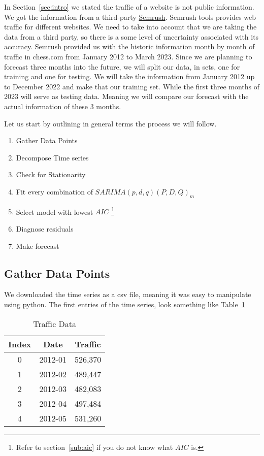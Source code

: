 \documentclass[journal]{IEEEtran}
\begin{document}
In Section~\ref{sec:intro} we stated the traffic of a website is not public
information. We got the information from a third-party
\href{http://semrush.com}{Semrush}. Semrush tools provides web traffic for
different websites. We need to take into account that we are taking the data
from a third party, so there is a some level of uncertainty associated with
its accuracy. Semrush provided us with the historic information month by month
of traffic in chess.com from January 2012 to March 2023. Since we are planning
to forecast three months into the future, we will split our data, in sets, one
for training and one for testing. We will take the information from January
2012 up to December 2022 and make that our training set. While the first three
months of 2023 will serve as testing data. Meaning we will compare our
forecast with the actual information of these 3 months.

Let us start by outlining in general terms the process we will follow.

\begin{enumerate}
    \item Gather Data Points
    \item Decompose Time series
    \item Check for Stationarity
    \item Fit every combination of $SARIMA(p,d,q)(P,D,Q)_m$
    \item Select model with lowest $AIC$ \footnote{Refer to
        section~\ref{sub:aic} if you do not know what $AIC$ is.}
    \item Diagnose residuals
    \item Make forecast
\end{enumerate}

\subsection{Gather Data Points}

We downloaded the time series as a csv file, meaning it was easy to manipulate
using python. The first entries of the time series, look something like
Table~\ref{tab:traffic}

\begin{table}[htbp]
  \centering
  \caption{Traffic Data}
  \label{tab:traffic}
  \begin{tabular}{|c|c|c|}
    \hline
    Index & Date & Traffic \\
    \hline
    0 & 2012-01 & 526,370 \\
    1 & 2012-02 & 489,447 \\
    2 & 2012-03 & 482,083 \\
    3 & 2012-04 & 497,484 \\
    4 & 2012-05 & 531,260 \\
    \hline
  \end{tabular}
\end{table}
\end{document}
